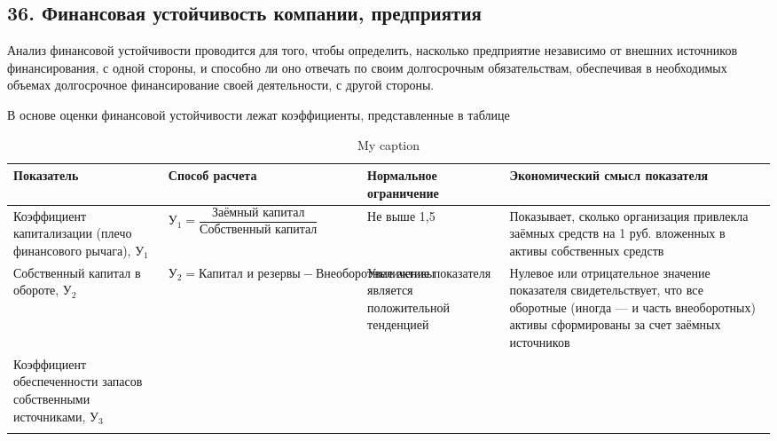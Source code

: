 \subsection*{36. Финансовая устойчивость компании, предприятия}

Анализ финансовой устойчивости проводится для того, чтобы определить, насколько предприятие независимо от внешних источников финансирования, с одной стороны, и способно ли оно отвечать по своим долгосрочным обязательствам, обеспечивая в необходимых объемах долгосрочное финансирование своей деятельности, с другой стороны.

В основе оценки финансовой устойчивости лежат коэффициенты, представленные в таблице

\begin{table}[!ht]
	\small
	\caption{My caption}
	\label{my-label}
	\setlength{\extrarowheight}{1mm}
	\begin{tabularx}{\textwidth}{|p{3.23cm}|K{5cm}|K{3cm}|K{4cm}|}
		\hline
		Показатель & Способ расчета &Нормальное ограничение&Экономический смысл показателя                                                                                                          \\ \hline
		Коэффициент капитализации (плечо финансового рычага), $\text{У}_1$        & $\text{У}_1 = \dfrac{\text{Заёмный капитал}}{\text{Собственный капитал}}$ & Не выше 1,5                                             & Показывает, сколько организация привлекла заёмных средств на 1 руб. вложенных в активы собственных средств                                                        \\ \hline
		Собственный капитал в обороте, $\text{У}_2$                               & $\text{У}_2 = \text{Капитал и резервы} - \text{Внеоборотные активы}$      & Увеличение показателя является положительной тенденцией & Нулевое или отрицательное значение показателя свидетельствует, что все оборотные (иногда --- и часть внеоборотных) активы сформированы за счет заёмных источников \\ \hline
		Коэффициент обеспеченности запасов собственными источниками, $\text{У}_3$ &                                                                    &                                                         &                                                                                                                                                                   \\ \hline
		&                                                                    &                                                         &                                                                                                                                                                   \\ \hline

\end{tabularx}
\end{table}
